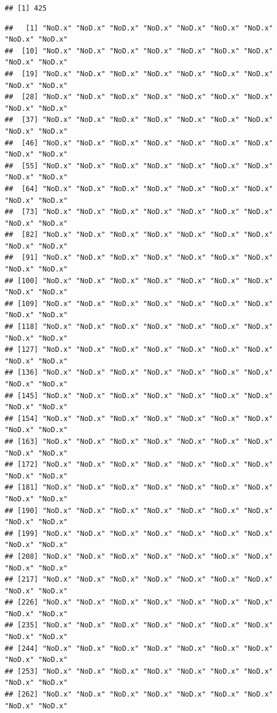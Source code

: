 \documentclass[
]{article}
\begin{document}
\begin{verbatim}
## [1] 425
\end{verbatim}

\begin{verbatim}
##   [1] "NoD.x" "NoD.x" "NoD.x" "NoD.x" "NoD.x" "NoD.x" "NoD.x" "NoD.x" "NoD.x"
##  [10] "NoD.x" "NoD.x" "NoD.x" "NoD.x" "NoD.x" "NoD.x" "NoD.x" "NoD.x" "NoD.x"
##  [19] "NoD.x" "NoD.x" "NoD.x" "NoD.x" "NoD.x" "NoD.x" "NoD.x" "NoD.x" "NoD.x"
##  [28] "NoD.x" "NoD.x" "NoD.x" "NoD.x" "NoD.x" "NoD.x" "NoD.x" "NoD.x" "NoD.x"
##  [37] "NoD.x" "NoD.x" "NoD.x" "NoD.x" "NoD.x" "NoD.x" "NoD.x" "NoD.x" "NoD.x"
##  [46] "NoD.x" "NoD.x" "NoD.x" "NoD.x" "NoD.x" "NoD.x" "NoD.x" "NoD.x" "NoD.x"
##  [55] "NoD.x" "NoD.x" "NoD.x" "NoD.x" "NoD.x" "NoD.x" "NoD.x" "NoD.x" "NoD.x"
##  [64] "NoD.x" "NoD.x" "NoD.x" "NoD.x" "NoD.x" "NoD.x" "NoD.x" "NoD.x" "NoD.x"
##  [73] "NoD.x" "NoD.x" "NoD.x" "NoD.x" "NoD.x" "NoD.x" "NoD.x" "NoD.x" "NoD.x"
##  [82] "NoD.x" "NoD.x" "NoD.x" "NoD.x" "NoD.x" "NoD.x" "NoD.x" "NoD.x" "NoD.x"
##  [91] "NoD.x" "NoD.x" "NoD.x" "NoD.x" "NoD.x" "NoD.x" "NoD.x" "NoD.x" "NoD.x"
## [100] "NoD.x" "NoD.x" "NoD.x" "NoD.x" "NoD.x" "NoD.x" "NoD.x" "NoD.x" "NoD.x"
## [109] "NoD.x" "NoD.x" "NoD.x" "NoD.x" "NoD.x" "NoD.x" "NoD.x" "NoD.x" "NoD.x"
## [118] "NoD.x" "NoD.x" "NoD.x" "NoD.x" "NoD.x" "NoD.x" "NoD.x" "NoD.x" "NoD.x"
## [127] "NoD.x" "NoD.x" "NoD.x" "NoD.x" "NoD.x" "NoD.x" "NoD.x" "NoD.x" "NoD.x"
## [136] "NoD.x" "NoD.x" "NoD.x" "NoD.x" "NoD.x" "NoD.x" "NoD.x" "NoD.x" "NoD.x"
## [145] "NoD.x" "NoD.x" "NoD.x" "NoD.x" "NoD.x" "NoD.x" "NoD.x" "NoD.x" "NoD.x"
## [154] "NoD.x" "NoD.x" "NoD.x" "NoD.x" "NoD.x" "NoD.x" "NoD.x" "NoD.x" "NoD.x"
## [163] "NoD.x" "NoD.x" "NoD.x" "NoD.x" "NoD.x" "NoD.x" "NoD.x" "NoD.x" "NoD.x"
## [172] "NoD.x" "NoD.x" "NoD.x" "NoD.x" "NoD.x" "NoD.x" "NoD.x" "NoD.x" "NoD.x"
## [181] "NoD.x" "NoD.x" "NoD.x" "NoD.x" "NoD.x" "NoD.x" "NoD.x" "NoD.x" "NoD.x"
## [190] "NoD.x" "NoD.x" "NoD.x" "NoD.x" "NoD.x" "NoD.x" "NoD.x" "NoD.x" "NoD.x"
## [199] "NoD.x" "NoD.x" "NoD.x" "NoD.x" "NoD.x" "NoD.x" "NoD.x" "NoD.x" "NoD.x"
## [208] "NoD.x" "NoD.x" "NoD.x" "NoD.x" "NoD.x" "NoD.x" "NoD.x" "NoD.x" "NoD.x"
## [217] "NoD.x" "NoD.x" "NoD.x" "NoD.x" "NoD.x" "NoD.x" "NoD.x" "NoD.x" "NoD.x"
## [226] "NoD.x" "NoD.x" "NoD.x" "NoD.x" "NoD.x" "NoD.x" "NoD.x" "NoD.x" "NoD.x"
## [235] "NoD.x" "NoD.x" "NoD.x" "NoD.x" "NoD.x" "NoD.x" "NoD.x" "NoD.x" "NoD.x"
## [244] "NoD.x" "NoD.x" "NoD.x" "NoD.x" "NoD.x" "NoD.x" "NoD.x" "NoD.x" "NoD.x"
## [253] "NoD.x" "NoD.x" "NoD.x" "NoD.x" "NoD.x" "NoD.x" "NoD.x" "NoD.x" "NoD.x"
## [262] "NoD.x" "NoD.x" "NoD.x" "NoD.x" "NoD.x" "NoD.x" "NoD.x" "NoD.x" "NoD.x"

\end{verbatim}
\end{document}
